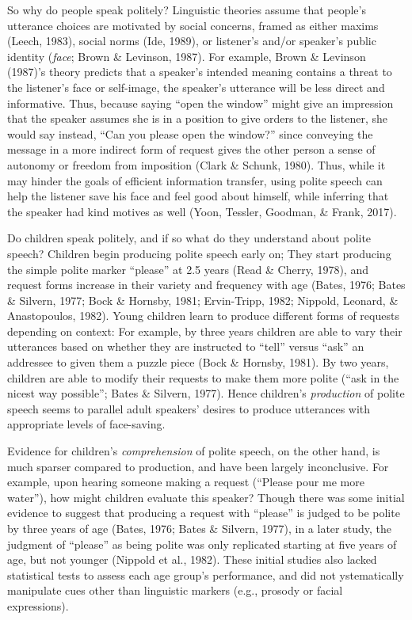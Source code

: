 \documentclass[10pt, letterpaper]{article}
\begin{document}
So why do people speak politely? Linguistic theories assume that
people's utterance choices are motivated by social concerns, framed as
either maxims (Leech, 1983), social norms (Ide, 1989), or listener's
and/or speaker's public identity (\emph{face}; Brown \& Levinson, 1987).
For example, Brown \& Levinson (1987)'s theory predicts that a speaker's
intended meaning contains a threat to the listener's face or self-image,
the speaker's utterance will be less direct and informative. Thus,
because saying ``open the window'' might give an impression that the
speaker assumes she is in a position to give orders to the listener, she
would say instead, ``Can you please open the window?'' since conveying
the message in a more indirect form of request gives the other person a
sense of autonomy or freedom from imposition (Clark \& Schunk, 1980).
Thus, while it may hinder the goals of efficient information transfer,
using polite speech can help the listener save his face and feel good
about himself, while inferring that the speaker had kind motives as well
(Yoon, Tessler, Goodman, \& Frank, 2017).

Do children speak politely, and if so what do they understand about
polite speech? Children begin producing polite speech early on; They
start producing the simple polite marker ``please'' at 2.5 years (Read
\& Cherry, 1978), and request forms increase in their variety and
frequency with age (Bates, 1976; Bates \& Silvern, 1977; Bock \&
Hornsby, 1981; Ervin-Tripp, 1982; Nippold, Leonard, \& Anastopoulos,
1982). Young children learn to produce different forms of requests
depending on context: For example, by three years children are able to
vary their utterances based on whether they are instructed to ``tell''
versus ``ask'' an addressee to given them a puzzle piece (Bock \&
Hornsby, 1981). By two years, children are able to modify their requests
to make them more polite (``ask in the nicest way possible''; Bates \&
Silvern, 1977). Hence children's \emph{production} of polite speech
seems to parallel adult speakers' desires to produce utterances with
appropriate levels of face-saving.

Evidence for children's \emph{comprehension} of polite speech, on the
other hand, is much sparser compared to production, and have been
largely inconclusive. For example, upon hearing someone making a request
(``Please pour me more water''), how might children evaluate this
speaker? Though there was some initial evidence to suggest that
producing a request with ``please'' is judged to be polite by three
years of age (Bates, 1976; Bates \& Silvern, 1977), in a later study,
the judgment of ``please'' as being polite was only replicated starting
at five years of age, but not younger (Nippold et al., 1982). These
initial studies also lacked statistical tests to assess each age group's
performance, and did not ystematically manipulate cues other than
linguistic markers (e.g., prosody or facial expressions).
\end{document}
